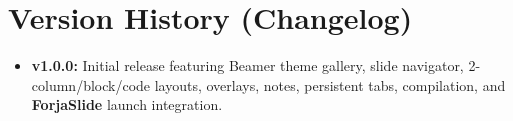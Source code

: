 \documentclass[11pt,a4paper]{article}
\begin{document}
\section{Version History (Changelog)}
\begin{itemize}
  \item \textbf{v1.0.0:} Initial release featuring Beamer theme gallery, slide navigator, 2-column/block/code layouts,  overlays,  notes, persistent  tabs,  compilation, and \textbf{ForjaSlide} launch integration.
\end{itemize}
\end{document}

